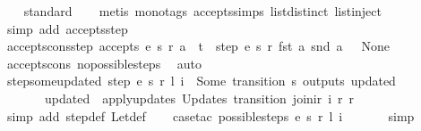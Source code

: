 \begin{isabellebody}
%
\isadelimproof
\ \ %
\endisadelimproof
%
\isatagproof
{}\isamarkupfalse%
\ standard\isanewline
\ \ \isamarkupfalse%
\ {\isacharparenleft}metis\ {\isacharparenleft}mono{\isacharunderscore}tags{\isacharparenright}\ accepts{\isachardot}simps\ list{\isachardot}distinct{\isacharparenleft}{}{\isacharparenright}\ list{\isachardot}inject{\isacharparenright}\isanewline
\ \ \isamarkupfalse%
\ {\isacharparenleft}simp\ add{\isacharcolon}\ accepts{\isachardot}step{\isacharparenright}%
\endisatagproof
{\isafoldproof}%
%
\isadelimproof
\isanewline
%
\endisadelimproof
\isanewline
{}\isamarkupfalse%
\ accepts{\isacharunderscore}cons{\isacharunderscore}step{\isacharcolon}\ {\isachardoublequoteopen}accepts\ e\ s\ r\ {\isacharparenleft}a\ {\isacharhash}\ t{\isacharparenright}\ {\isasymLongrightarrow}\ step\ e\ s\ r\ {\isacharparenleft}fst\ a{\isacharparenright}\ {\isacharparenleft}snd\ a{\isacharparenright}\ {\isasymnoteq}\ \ None{\isachardoublequoteclose}\isanewline
%
\isadelimproof
\ \ %
\endisadelimproof
%
\isatagproof
{}\isamarkupfalse%
\ accepts{\isacharunderscore}cons\ no{\isacharunderscore}possible{\isacharunderscore}steps{\isacharunderscore}{}\ \isamarkupfalse%
\ auto%
\endisatagproof
{\isafoldproof}%
%
\isadelimproof
\isanewline
%
\endisadelimproof
\isanewline
{}\isamarkupfalse%
\ step{\isacharunderscore}some{\isacharunderscore}updated{\isacharcolon}\ {\isachardoublequoteopen}step\ e\ s\ r\ l\ i\ {\isacharequal}\ Some\ {\isacharparenleft}transition{\isacharcomma}\ s{\isacharprime}{\isacharcomma}\ outputs{\isacharcomma}\ updated{\isacharparenright}\ {\isasymLongrightarrow}\isanewline
\ \ \ \ \ \ \ updated\ {\isacharequal}\ {\isacharparenleft}apply{\isacharunderscore}updates\ {\isacharparenleft}Updates\ transition{\isacharparenright}\ {\isacharparenleft}join{\isacharunderscore}ir\ i\ r{\isacharparenright}\ r{\isacharparenright}{\isachardoublequoteclose}\isanewline
%
\isadelimproof
\ \ %
\endisadelimproof
%
\isatagproof
{}\isamarkupfalse%
\ {\isacharparenleft}simp\ add{\isacharcolon}\ step{\isacharunderscore}def\ Let{\isacharunderscore}def{\isacharparenright}\isanewline
\ \ \isamarkupfalse%
\ {\isacharparenleft}case{\isacharunderscore}tac\ {\isachardoublequoteopen}possible{\isacharunderscore}steps\ e\ s\ r\ l\ i\ {\isacharequal}\ {\isacharbraceleft}{\isacharbar}{\isacharbar}{\isacharbraceright}{\isachardoublequoteclose}{\isacharparenright}\isanewline
\ \ \ \isamarkupfalse%
\ simp\isanewline

\end{isabellebody}
